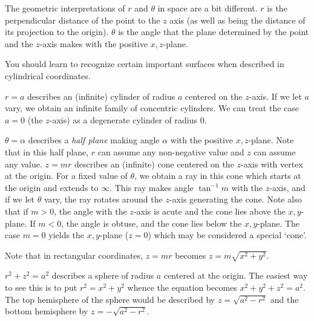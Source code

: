 The geometric interpretations of $r$ and $\theta$ in space
are a bit different.  $r$ is the perpendicular distance of the
point to the $z$ axis (as well as being the distance of its
projection to the origin).  $\theta$ is the angle that the plane
determined by the point and the $z$-axis makes with the
positive $x,z$-plane.

You should learn to recognize certain important surfaces when
described in cylindrical coordinates.

\nextex
{}  $r = a$ describes an (infinite) cylinder
of radius $a$ centered on the $z$-axis.  If we let $a$ vary, we
obtain an infinite family of concentric cylinders.  We can treat
the case $a = 0$ (the $z$-axis) as a degenerate cylinder of
radius 0.
\endexample
\medskip
\centerline{}
\medskip
\nextex
{}  $\theta = \alpha$ describes a {\it half
plane\/} making angle $\alpha$ with the positive $x,z$-plane.
Note that in this half plane, $r$ can assume any non-negative
value and $z$ can assume any value.
\endexample
\nextex
{}  $z = mr$  describes an (infinite)
  cone centered
on the $z$-axis with vertex at the origin.  For a fixed value
of $\theta$, we obtain a ray in this cone which starts at
the origin and extends to $\infty$.  This ray makes angle
$\tan^{-1} m$ with the $z$-axis, and if we let $\theta$
vary, the ray rotates around the $z$-axis generating the
cone.  Note also that if $m > 0$, the angle with the $z$-axis
is acute and the cone lies above the $x,y$-plane.  If
$m < 0$, the angle is obtuse, and the cone lies below the
$x,y$-plane.  The case $m = 0$ yields the $x,y$-plane
($z = 0$) which may be considered a special `cone'.

Note that in rectangular coordinates,  $z = mr$ becomes
$z = m\sqrt{x^2 + y^2}$.
\endexample
\medskip
\centerline{}
\medskip
\nextex
{}  $r^2 + z^2 = a^2$ describes a sphere
of radius $a$ centered at the origin.  The easiest way to
see this is to put $r^2 = x^2 + y^2$ whence the equation
becomes $x^2 + y^2 + z^2 = a^2$.  The top hemisphere of the
sphere would be described by $z = \sqrt{a^2 - r^2}$
and the bottom hemisphere by
 $z = -\sqrt{a^2 - r^2}$.
\endexample

